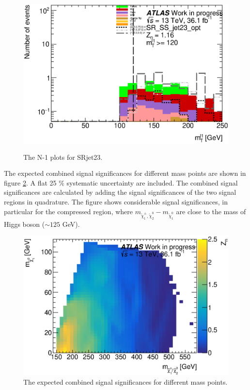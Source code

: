 \begin{figure}[htpb]
\includegraphics[width=0.45\linewidth]{data/plot/plot_SR/mt1_SR_SS_jet23_opt_0}\\
\caption{The N-1 plots for SRjet23.}
\label{fig:SRjet23_N1}
\end{figure}

The expected combined signal significances for different mass points are shown in figure \ref{fig:SR_expected_limit}.
A flat 25 \% systematic uncertainty are included.
The combined signal significances are calculated by adding the signal significances of the two signal regions in quadrature.
The figure shows considerable signal significances, in particular for the compressed region, where $m_{\tilde{\chi}_1^\pm , \tilde{\chi}_2^0} - m_{\tilde{\chi}_1^0}$ are close to the mass of Higgs boson ($\sim 125$ GeV).

\begin{figure}[htpb]
\centering
\includegraphics[width=0.5\linewidth]{data/plot/plot_SR/combine_significance_0}
\caption{The expected combined signal significances for different mass points.}
\label{fig:SR_expected_limit}
\end{figure}
